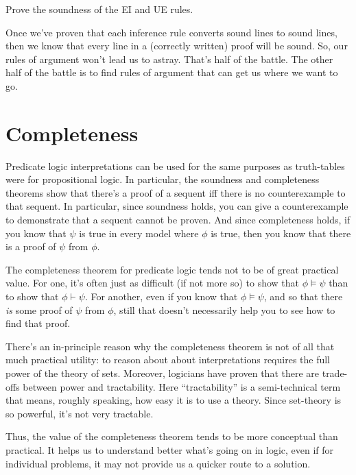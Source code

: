 \begin{exercise} Prove the soundness of the EI and UE
  rules. \end{exercise}

Once we've proven that each inference rule converts sound lines to
sound lines, then we know that every line in a (correctly written)
proof will be sound.  So, our rules of argument won't lead us to
astray.  That's half of the battle.  The other half of the battle is
to find rules of argument that can get us where we want to go.



\section{Completeness}



Predicate logic interpretations can be used for the same purposes as
truth-tables were for propositional logic.  In particular, the
soundness and completeness theorems show that there's a proof of a
sequent iff there is no counterexample to that sequent.  In
particular, since soundness holds, you can give a counterexample to
demonstrate that a sequent cannot be proven.  And since completeness
holds, if you know that $\psi$ is true in every model where $\phi$ is
true, then you know that there is a proof of $\psi$ from $\phi$.

The completeness theorem for predicate logic tends not to be of great
practical value.  For one, it's often just as difficult (if not more
so) to show that $\phi\vDash\psi$ than to show that $\phi\vdash\psi$.
For another, even if you know that $\phi\vDash\psi$, and so that there
{\it is} some proof of $\psi$ from $\phi$, still that doesn't
necessarily help you to see how to find that proof.

There's an in-principle reason why the completeness theorem is not of
all that much practical utility: to reason about about interpretations
requires the full power of the theory of sets.  Moreover, logicians
have proven that there are trade-offs between power and tractability.
Here ``tractability'' is a semi-technical term that means, roughly
speaking, how easy it is to use a theory.  Since set-theory is so
powerful, it's not very tractable.

Thus, the value of the completeness theorem tends to be more
conceptual than practical.  It helps us to understand better what's
going on in logic, even if for individual problems, it may not provide
us a quicker route to a solution.

